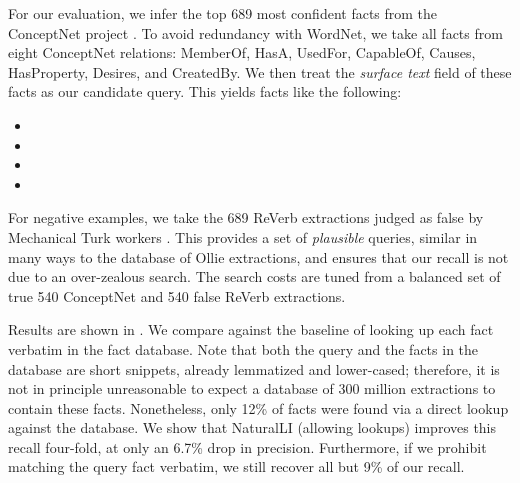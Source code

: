 For our evaluation, we infer the top 689 most confident facts from
  the ConceptNet project \cite{key:2011tandon-conceptnet}.
To avoid redundancy with WordNet, we take all facts from eight
  ConceptNet relations: 
    MemberOf,
    HasA,
    UsedFor,
    CapableOf,
    Causes,
    HasProperty,
    Desires, and 
    CreatedBy.
We then treat the \textit{surface text} field of these facts as our
  candidate query.
This yields facts like the following:

\vspace{-0.25em}
\begin{itemize}
\setlength{\itemsep}{-4pt}
\item[] 
\item[] 
\item[] 
\item[] 
\end{itemize}
\vspace{-0.25em}

For negative examples, we take the 689 ReVerb extractions
  \cite{key:2011fader-reverb}
  judged as false by Mechanical Turk workers \cite{key:2013angeli-truth}.
This provides a set of \textit{plausible} queries, similar in many
  ways to the database of Ollie extractions, and ensures that our
  recall is not due to an over-zealous search.
The search costs are tuned from a balanced set of true 540 ConceptNet and
  540 false ReVerb extractions.

Results are shown in .
We compare against the baseline of looking up each fact verbatim in the
  fact database.
Note that both the query and the facts in the database are 
  short snippets, already lemmatized and lower-cased;
  therefore, it is not in principle unreasonable to
  expect a database of 300 million extractions to contain these facts.
Nonetheless, only 12\% of facts were found via a direct lookup against
  the database.
We show that NaturalLI (allowing lookups) improves this recall
  four-fold, at only an 6.7\% drop in precision.
Furthermore, if we prohibit matching the query fact verbatim,
  we still recover all but 9\% of our recall.



%
%
